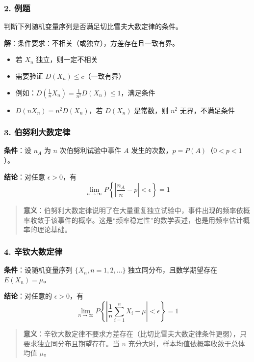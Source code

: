 \documentclass[12pt,a4paper]{ctexart}
\newenvironment{myquote}
  {\par\vspace{0.5em}\begin{quote}\sffamily\color{gray}}
  {\end{quote}\vspace{0.5em}}
\begin{document}
\subsubsection{2. 例题}
判断下列随机变量序列是否满足切比雪夫大数定律的条件。

\textbf{解}：条件要求：不相关（或独立），方差存在且一致有界。
\begin{itemize}[noitemsep]
    \item 若 $X_n$ 独立，则一定不相关
    \item 需要验证 $D(X_n) \le c$（一致有界）
    \item 例如：$D(\frac{1}{n}X_n) = \frac{1}{n^2} D(X_n) \le 1$，满足条件
    \item $D(nX_n) = n^2 D(X_n)$，若 $D(X_n)$ 是常数，则 $n^2$ 无界，不满足条件
\end{itemize}

\subsubsection{3. 伯努利大数定律}
\textbf{条件}：设 $n_A$ 为 $n$ 次伯努利试验中事件 $A$ 发生的次数，$p = P(A)$（$0 < p < 1$）。

\textbf{结论}：对任意 $\epsilon > 0$，有
\[
    \lim_{n \to \infty} P\left\{\left|\frac{n_A}{n} - p\right| < \epsilon\right\} = 1
\]

\begin{myquote}
    \textbf{意义}：伯努利大数定律说明了在大量重复独立试验中，事件出现的频率依概率收敛于该事件的概率。这是“频率稳定性”的数学表述，也是用频率估计概率的理论基础。
\end{myquote}

\subsubsection{4. 辛钦大数定律}
\textbf{条件}：设随机变量序列 $\{X_n, n = 1, 2, \dots\}$ 独立同分布，且数学期望存在 $E(X_n) = \mu$。

\textbf{结论}：对任意的 $\epsilon > 0$，有
\[
    \lim_{n \to \infty} P\left\{\left|\frac{1}{n} \sum_{i=1}^n X_i - \mu\right| < \epsilon\right\} = 1
\]

\begin{myquote}
    \textbf{意义}：辛钦大数定律不要求方差存在（比切比雪夫大数定律条件更弱），只要求独立同分布且期望存在。当 $n$ 充分大时，样本均值依概率收敛于总体均值 $\mu$。
\end{myquote}
\end{document}
